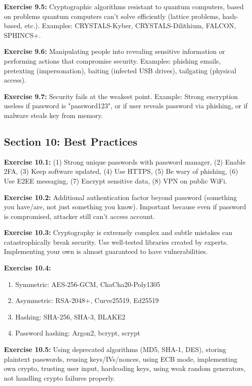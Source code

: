 \documentclass[11pt,a4paper]{report}
\begin{document}
\textbf{Exercise 9.5:}
Cryptographic algorithms resistant to quantum computers, based on problems quantum computers can't solve efficiently (lattice problems, hash-based, etc.). Examples: CRYSTALS-Kyber, CRYSTALS-Dilithium, FALCON, SPHINCS+.

\textbf{Exercise 9.6:}
Manipulating people into revealing sensitive information or performing actions that compromise security. Examples: phishing emails, pretexting (impersonation), baiting (infected USB drives), tailgating (physical access).

\textbf{Exercise 9.7:}
Security fails at the weakest point. Example: Strong encryption useless if password is "password123", or if user reveals password via phishing, or if malware steals key from memory.

\subsection*{Section 10: Best Practices}

\textbf{Exercise 10.1:}
(1) Strong unique passwords with password manager, (2) Enable 2FA, (3) Keep software updated, (4) Use HTTPS, (5) Be wary of phishing, (6) Use E2EE messaging, (7) Encrypt sensitive data, (8) VPN on public WiFi.

\textbf{Exercise 10.2:}
Additional authentication factor beyond password (something you have/are, not just something you know). Important because even if password is compromised, attacker still can't access account.

\textbf{Exercise 10.3:}
Cryptography is extremely complex and subtle mistakes can catastrophically break security. Use well-tested libraries created by experts. Implementing your own is almost guaranteed to have vulnerabilities.

\textbf{Exercise 10.4:}
\begin{enumerate}[label=\alph*)]
    \item Symmetric: AES-256-GCM, ChaCha20-Poly1305
    \item Asymmetric: RSA-2048+, Curve25519, Ed25519
    \item Hashing: SHA-256, SHA-3, BLAKE2
    \item Password hashing: Argon2, bcrypt, scrypt
\end{enumerate}

\textbf{Exercise 10.5:}
Using deprecated algorithms (MD5, SHA-1, DES), storing plaintext passwords, reusing keys/IVs/nonces, using ECB mode, implementing own crypto, trusting user input, hardcoding keys, using weak random generators, not handling crypto failures properly.
\end{document}
